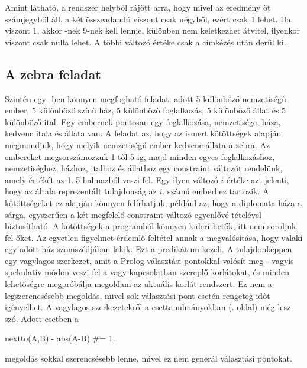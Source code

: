Amint látható, a rendszer helyből rájött arra, hogy mivel az eredmény öt
számjegyből áll, a két összeadandó viszont csak négyből, ezért 
csak 1 lehet. Ha viszont  1, akkor -nek 9-nek kell lennie,
különben nem keletkezhet átvitel, ilyenkor viszont  csak nulla lehet.
A többi változó értéke csak a címkézés után derül ki.

\subsection{A zebra feladat}
Szintén egy \Clpfd -ben könnyen megfogható feladat: adott 5 különböző
nemzetiségű ember, 5 különböző színű ház, 5 különböző foglalkozás, 5
különböző állat és 5 különböző ital. Egy embernek pontosan egy
foglalkozása, nemzetisége, háza, kedvenc itala és állata van. A
feladat az, hogy az ismert kötöttségek alapján megmondjuk, hogy melyik
nemzetiségű ember kedvenc állata a zebra. Az embereket megsorszámozzuk
1-től 5-ig, majd minden egyes foglalkozáshoz, nemzetiséghez, házhoz,
italhoz és állathoz egy constraint változót rendelünk, amely értékét
az 1..5 halmazból veszi fel. Egy ilyen változó $i$ értéke azt jelenti,
hogy az általa reprezentált tulajdonság az $i$. számú emberhez
tartozik. A kötöttségeket ez alapján könnyen felírhatjuk, például az,
hogy a diplomata háza a sárga, egyszerűen a két megfelelő
constraint-változó egyenlővé tételével biztosítható.  A kötöttségek a
programból könnyen kideríthetők, itt nem soroljuk fel őket. Az
egyetlen figyelmet érdemlő feltétel annak a megvalósítása, hogy
valaki egy adott ház szomszédjában lakik. Ezt a  predikátum
kezeli. A  tulajdonképpen egy vagylagos szerkezet, amit a
Prolog választási pontokkal valósít meg - vagyis spekulatív módon veszi fel a
vagy-kapcsolatban szereplő korlátokat, és minden lehetőségre
megpróbálja megoldani az aktuális korlát rendszert. Ez nem a legszerencsésebb
megoldás, mivel sok választási pont esetén rengeteg időt igényelhet. A
vagylagos szerkezetekről a \clpfd esettanulmányokban (\pageref{diszjunkcio}.
oldal) még lesz szó. Adott esetben a

\begin{prologcode}
nextto(A,B):- abs(A-B) #= 1.
\end{prologcode}

megoldás sokkal szerencsésebb lenne, mivel ez nem generál választási
pontokat.


